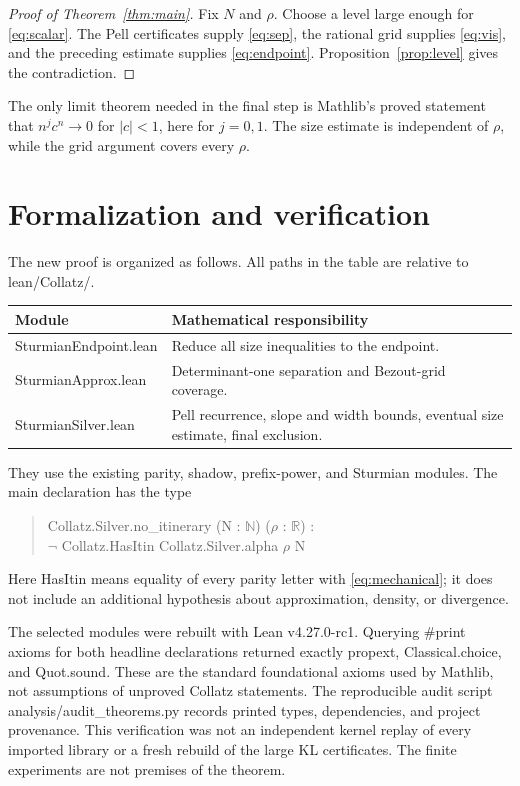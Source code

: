 \documentclass[11pt]{article}
\theoremstyle{remark}
\newcommand{\N}{\mathbb N}
\newcommand{\R}{\mathbb R}
\newcommand{\code}[1]{{\small\ttfamily #1}}
\begin{document}
\begin{proof}[Proof of Theorem~\ref{thm:main}]
Fix $N$ and $\rho$. Choose a level large enough for \eqref{eq:scalar}.
The Pell certificates supply \eqref{eq:sep}, the rational grid supplies
\eqref{eq:vis}, and the preceding estimate supplies
\eqref{eq:endpoint}. Proposition~\ref{prop:level} gives the contradiction.
\end{proof}
The only limit theorem needed in the final step is Mathlib's proved
statement that $n^j c^n\to0$ for $|c|<1$, here for $j=0,1$.
The size estimate is independent of $\rho$, while the grid argument
covers every $\rho$.

\section{Formalization and verification}
The new proof is organized as follows. All paths in the table are
relative to \code{lean/Collatz/}.
\begin{center}
\small
\begin{tabularx}{\linewidth}{@{}lX@{}}
\toprule
Module & Mathematical responsibility\\
\midrule
\code{SturmianEndpoint.lean} & Reduce all size inequalities to the endpoint.\\
\code{SturmianApprox.lean} & Determinant-one separation and Bezout-grid coverage.\\
\code{SturmianSilver.lean} & Pell recurrence, slope and width bounds, eventual size estimate, final exclusion.\\
\bottomrule
\end{tabularx}
\end{center}
They use the existing parity, shadow, prefix-power, and Sturmian modules.
The main declaration has the type
\begin{quote}\small\ttfamily
Collatz.Silver.no\_\allowbreak{}itinerary (N : $\N$) ($\rho$ : $\R$) :\\
\hspace*{1em}$\neg$ Collatz.HasItin Collatz.Silver.alpha $\rho$ N
\end{quote}
Here \code{HasItin} means equality of every parity letter with
\eqref{eq:mechanical}; it does not include an additional hypothesis
about approximation, density, or divergence.

The selected modules were rebuilt with Lean
\code{v4.27.0-rc1}. Querying \code{\#print axioms} for both headline
declarations returned exactly \code{propext}, \code{Classical.choice},
and \code{Quot.sound}. These are the standard foundational axioms used
by Mathlib, not assumptions of unproved Collatz statements. The
reproducible audit script \code{analysis/audit\_\allowbreak{}theorems.py} records
printed types, dependencies, and project provenance. This verification
was not an independent kernel replay of every imported library or a
fresh rebuild of the large KL certificates. The finite experiments are
not premises of the theorem.
\end{document}
